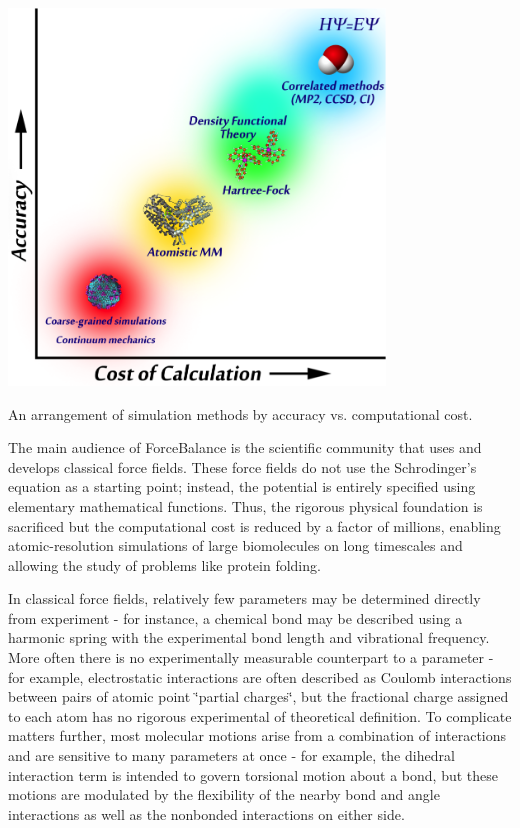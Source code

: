 \begin{DoxyImage}
\includegraphics[width=10cm]{ladder.png}
\caption{An arrangement of simulation methods by accuracy vs. computational cost.}
\end{DoxyImage}


The main audience of Force\-Balance is the scientific community that uses and develops classical force fields. These force fields do not use the Schrodinger's equation as a starting point; instead, the potential is entirely specified using elementary mathematical functions. Thus, the rigorous physical foundation is sacrificed but the computational cost is reduced by a factor of millions, enabling atomic-\/resolution simulations of large biomolecules on long timescales and allowing the study of problems like protein folding.

In classical force fields, relatively few parameters may be determined directly from experiment -\/ for instance, a chemical bond may be described using a harmonic spring with the experimental bond length and vibrational frequency. More often there is no experimentally measurable counterpart to a parameter -\/ for example, electrostatic interactions are often described as Coulomb interactions between pairs of atomic point \char`\"{}partial charges\char`\"{}, but the fractional charge assigned to each atom has no rigorous experimental of theoretical definition. To complicate matters further, most molecular motions arise from a combination of interactions and are sensitive to many parameters at once -\/ for example, the dihedral interaction term is intended to govern torsional motion about a bond, but these motions are modulated by the flexibility of the nearby bond and angle interactions as well as the nonbonded interactions on either side.


